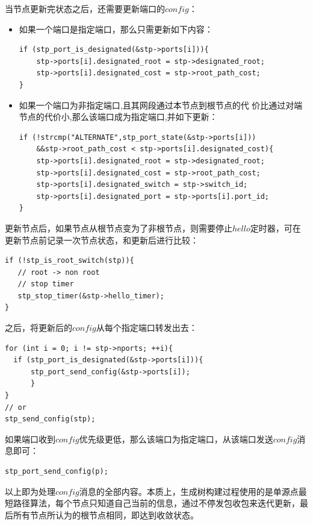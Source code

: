 \documentclass[UTF8,noindent]{ctexart}
\begin{document}
当节点更新完状态之后，还需要更新端口的$config$：
\begin{itemize}
  \item 如果一个端口是指定端口，那么只需更新如下内容：
\begin{lstlisting}
if (stp_port_is_designated(&stp->ports[i])){
    stp->ports[i].designated_root = stp->designated_root;
    stp->ports[i].designated_cost = stp->root_path_cost;
}
\end{lstlisting}
\item 如果一个端口为非指定端口,且其网段通过本节点到根节点的代
价比通过对端节点的代价小,那么该端口成为指定端口,并如下更新：
\begin{lstlisting}
if (!strcmp("ALTERNATE",stp_port_state(&stp->ports[i]))
    &&stp->root_path_cost < stp->ports[i].designated_cost){
    stp->ports[i].designated_root = stp->designated_root;
    stp->ports[i].designated_cost = stp->root_path_cost;
    stp->ports[i].designated_switch = stp->switch_id;
    stp->ports[i].designated_port = stp->ports[i].port_id;
}
\end{lstlisting}
\end{itemize}

更新节点后，如果节点从根节点变为了非根节点，则需要停止$hello$定时器，可在更新节点前记录一次节点状态，和更新后进行比较：
\begin{lstlisting}
if (!stp_is_root_switch(stp)){
   // root -> non root
   // stop timer
   stp_stop_timer(&stp->hello_timer);
}
\end{lstlisting}

之后，将更新后的$config$从每个指定端口转发出去：
\begin{lstlisting}
for (int i = 0; i != stp->nports; ++i){
  if (stp_port_is_designated(&stp->ports[i])){
      stp_port_send_config(&stp->ports[i]);
      }
}
// or 
stp_send_config(stp);
\end{lstlisting}

如果端口收到$config$优先级更低，那么该端口为指定端口，从该端口发送$config$消息即可：
\begin{lstlisting}
stp_port_send_config(p);
\end{lstlisting}

以上即为处理$config$消息的全部内容。本质上，生成树构建过程使用的是单源点最短路径算法，每个节点只知道自己当前的信息，通过不停发包收包来迭代更新，最后所有节点所认为的根节点相同，即达到收敛状态。
\end{document}
